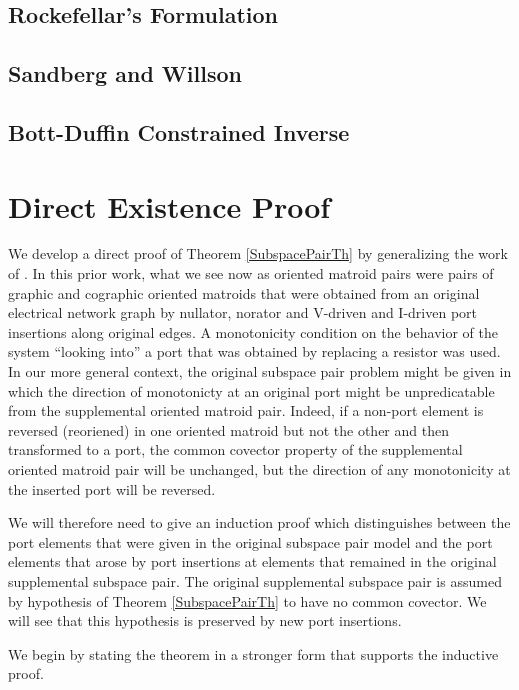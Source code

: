 \documentclass{amsproc-sunycstr}
\theoremstyle{plain}
\theoremstyle{definition}
\theoremstyle{remark}
\begin{document}
\subsection{Rockefellar's Formulation}

\subsection{Sandberg and Willson}

\subsection{Bott-Duffin Constrained Inverse}



\section{Direct Existence Proof}
\label{DirectProofSection}
We develop a direct proof of Theorem \ref{SubspacePairTh} by generalizing the 
work of \cite{HaslerNeirynck,Fosseprez}.  
In this prior work, what we see now as oriented matroid pairs
were pairs of graphic and cographic oriented matroids that were
obtained from an original electrical network graph by 
nullator, norator and V-driven and I-driven port insertions
along original edges.  A monotonicity condition on the behavior of the
system ``looking into'' a port that was obtained by replacing a resistor
was used.  In our more general context, the original subspace pair
problem might be given in which the direction of monotonicty at an original
port might be unpredicatable from the supplemental oriented matroid pair.
Indeed, if a non-port element is reversed (reoriened) in one oriented matroid
but not the other and then transformed to a port, the common covector property
of the supplemental oriented matroid pair will be unchanged, but the direction
of any monotonicity at the inserted port will be reversed.

We will therefore need to give an induction proof
which distinguishes between the port elements that 
were given in the original subspace pair model and the port
elements that arose by port insertions at elements that remained in the
original supplemental subspace pair.   The original supplemental subspace
pair is assumed by hypothesis of Theorem 
\ref{SubspacePairTh} to have no common covector.
We will see that this hypothesis is preserved by new port insertions.

We begin by stating the theorem 
in a stronger form that supports the inductive proof.
\end{document}
